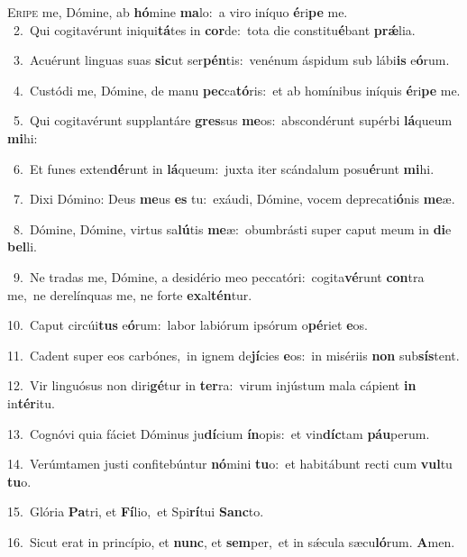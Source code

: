\lettrine{\initial\textcolor{\initialcolor}{E}}{ripe} me, Dómine, ab \textbf{hó}\-mine \textbf{ma}\-lo:~\star a viro iníquo \textbf{é}\-ri\textbf{pe} me.\\
{\numbfont\textcolor{\numbcolor}{~2.}}~Qui cogitavérunt iniqui\-\textbf{tá}\-tes in \textbf{cor}\-de:~\star tota die constitu\-\textbf{é}\-bant \textbf{prǽ}\-lia.\par
{\numbfont\textcolor{\numbcolor}{~3.}}~Acuérunt linguas suas \textbf{sic}\-ut ser\-\textbf{pén}\-tis:~\star venénum áspidum sub lábi\textbf{is} e\-\textbf{ó}\-rum.\par
{\numbfont\textcolor{\numbcolor}{~4.}}~Custódi me, Dómine, de manu \textbf{pec}\-ca\-\textbf{tó}\-ris:~\star et ab homínibus iníquis \textbf{é}\-ri\textbf{pe} me.\par
{\numbfont\textcolor{\numbcolor}{~5.}}~Qui cogitavérunt supplantáre \textbf{gres}\-sus \textbf{me}\-os:~\star abscondérunt supérbi \textbf{lá}\-queum \textbf{mi}\-hi:\par
{\numbfont\textcolor{\numbcolor}{~6.}}~Et funes exten\-\textbf{dé}\-runt in \textbf{lá}\-queum:~\star juxta iter scándalum posu\-\textbf{é}\-runt \textbf{mi}\-hi.\par
{\numbfont\textcolor{\numbcolor}{~7.}}~Dixi Dómino: Deus \textbf{me}\-us \textbf{es} tu:~\star exáudi, Dómine, vocem deprecati\-\textbf{ó}\-nis \textbf{me}\-æ.\par
{\numbfont\textcolor{\numbcolor}{~8.}}~Dómine, Dómine, virtus sa\-\textbf{lú}\-tis \textbf{me}\-æ:~\star obumbrásti super caput meum in \textbf{di}\-e \textbf{bel}\-li.\par
{\numbfont\textcolor{\numbcolor}{~9.}}~Ne tradas me, Dómine, a desidério meo peccatóri:~\dagger cogita\-\textbf{vé}\-runt \textbf{con}\-tra me,~\star ne derelínquas me, ne forte \textbf{ex}\-al\-\textbf{tén}\-tur.\par
{\numbfont\textcolor{\numbcolor}{10.}}~Caput circúi\textbf{tus} e\-\textbf{ó}\-rum:~\star labor labiórum ipsórum o\-\textbf{pé}\-riet \textbf{e}\-os.\par
{\numbfont\textcolor{\numbcolor}{11.}}~Cadent super eos carbónes,~\dagger in ignem de\-\textbf{jí}\-cies \textbf{e}\-os:~\star in misériis \textbf{non} sub\-\textbf{sís}\-tent.\par
{\numbfont\textcolor{\numbcolor}{12.}}~Vir linguósus non diri\-\textbf{gé}\-tur in \textbf{ter}\-ra:~\star virum injústum mala cápient \textbf{in} in\-\textbf{tér}\-itu.\par
{\numbfont\textcolor{\numbcolor}{13.}}~Cognóvi quia fáciet Dóminus ju\-\textbf{dí}\-cium \textbf{ín}\-opis:~\star et vin\-\textbf{díc}\-tam \textbf{páu}\-perum.\par
{\numbfont\textcolor{\numbcolor}{14.}}~Verúmtamen justi confitebúntur \textbf{nó}\-mini \textbf{tu}\-o:~\star et habitábunt recti cum \textbf{vul}\-tu \textbf{tu}\-o.\par
{\numbfont\textcolor{\numbcolor}{15.}}~Glória \textbf{Pa}\-tri, et \textbf{Fí}\-lio,~\star et Spi\-\textbf{rí}\-tui \textbf{Sanc}\-to.\par
{\numbfont\textcolor{\numbcolor}{16.}}~Sicut erat in princípio, et \textbf{nunc}\-, et \textbf{sem}\-per,~\star et in sǽcula sæcu\-\textbf{ló}\-rum. \textbf{A}\-men.\par
